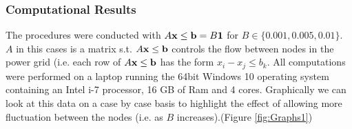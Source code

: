 \subsubsection{Computational Results}


The procedures were conducted with $A\mathbf{x} \leq \mathbf{b} = B \mathbf{1}$ for $B\in\{0.001, 0.005,0.01\}$.
$A$ in this cases is a matrix s.t. $A\mathbf{x} \leq \mathbf{b}$ controls the flow between nodes in the power grid (i.e. each row of $A\mathbf{x} \leq \mathbf{b}$ has the form $x_i-x_j\leq b_k$. 
All computations were performed on a laptop running the 64bit Windows 10 operating system containing an Intel i-7 processor, 16 GB of Ram and 4 cores. 
Graphically we can look at this data on a case by case basis to highlight the effect of allowing more fluctuation between the nodes (i.e. as $B$ increases).(Figure \ref{fig:Graphs1}) 

